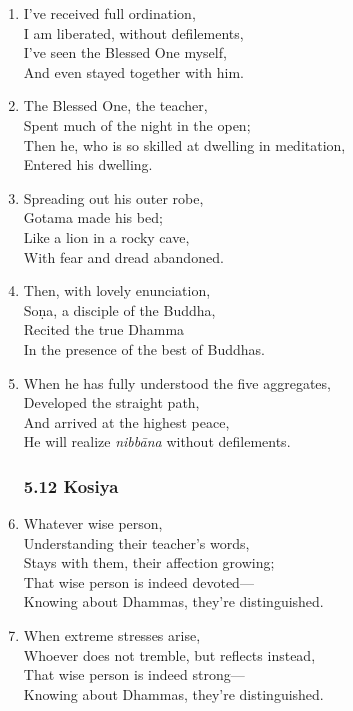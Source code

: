 \documentclass[10pt, openany]{book}
\begin{document}
\begin{enumerate}
\item I’ve received full ordination,\\
I am liberated, without defilements,\\
I’ve seen the Blessed One myself,\\
And even stayed together with him.

\item The Blessed One, the teacher,\\
Spent much of the night in the open;\\
Then he, who is so skilled at dwelling in meditation,\\
Entered his dwelling.

\item Spreading out his outer robe,\\
Gotama made his bed;\\
Like a lion in a rocky cave,\\
With fear and dread abandoned.

\item Then, with lovely enunciation,\\
Soṇa, a disciple of the Buddha,\\
Recited the true Dhamma\\
In the presence of the best of Buddhas.

\item When he has fully understood the five aggregates,\\
Developed the straight path,\\
And arrived at the highest peace,\\
He will realize \emph{nibbāna} without defilements.

\subsubsection*{5.12 Kosiya}

\item Whatever wise person, \\
Understanding their teacher’s words,\\
Stays with them, their affection growing;\\
That wise person is indeed devoted—\\
Knowing about Dhammas, they’re distinguished.

\item When extreme stresses arise,\\
Whoever does not tremble, but reflects instead,\\
That wise person is indeed strong—\\
Knowing about Dhammas, they’re distinguished.


\end{enumerate}
\end{document}
